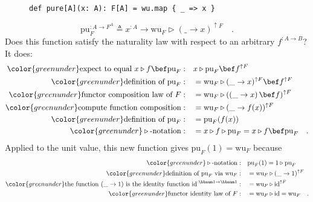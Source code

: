 \begin{wrapfigure}{l}{0.46\columnwidth}%
\vspace{-0.8\baselineskip}
\begin{lstlisting}
def pure[A](x: A): F[A] = wu.map { _ => x }
\end{lstlisting}
\vspace{-0.5\baselineskip}
\end{wrapfigure}%

\noindent \vspace{-1\baselineskip}
\begin{equation}
\text{pu}_{F}^{:A\rightarrow F^{A}}\triangleq x^{:A}\rightarrow\text{wu}_{F}\triangleright(\_\rightarrow x)^{\uparrow F}\quad.\label{eq:pu-via-wu-def}
\end{equation}
Does this function satisfy the naturality law with respect to an arbitrary
$f^{:A\rightarrow B}$? It does:
\begin{align*}
{\color{greenunder}\text{expect to equal }x\triangleright f\bef\text{pu}_{F}:}\quad & x\triangleright\text{pu}_{F}\bef f^{\uparrow F}\\
{\color{greenunder}\text{definition of }\text{pu}_{F}:}\quad & =\text{wu}_{F}\triangleright(\_\rightarrow x)^{\uparrow F}\bef f^{\uparrow F}\\
{\color{greenunder}\text{functor composition law of }F:}\quad & =\text{wu}_{F}\triangleright(\left(\_\rightarrow x\right)\bef f)^{\uparrow F}\\
{\color{greenunder}\text{compute function composition}:}\quad & =\text{wu}_{F}\triangleright(\_\rightarrow f(x))^{\uparrow F}\\
{\color{greenunder}\text{definition of }\text{pu}_{F}:}\quad & =\text{pu}_{F}(f(x))\\
{\color{greenunder}\triangleright\text{-notation}:}\quad & =x\triangleright f\triangleright\text{pu}_{F}=x\triangleright f\bef\text{pu}_{F}\quad.
\end{align*}
Applied to the unit value, this new function gives $\text{pu}_{F}(1)=\text{wu}_{F}$
because
\begin{align*}
{\color{greenunder}\triangleright\text{-notation}:}\quad & \text{pu}_{F}(1)=1\triangleright\text{pu}_{F}\\
{\color{greenunder}\text{definition of }\text{pu}_{F}\text{ via }\text{wu}_{F}:}\quad & =\text{wu}_{F}\triangleright(\_\rightarrow1)^{\uparrow F}\\
{\color{greenunder}\text{the function }(\_\rightarrow1)\text{ is the identity function }\text{id}^{:\bbnum 1\rightarrow\bbnum 1}:}\quad & =\text{wu}_{F}\triangleright\text{id}^{\uparrow F}\\
{\color{greenunder}\text{functor identity law of }F:}\quad & =\text{wu}_{F}\triangleright\text{id}=\text{wu}_{F}\quad.
\end{align*}

